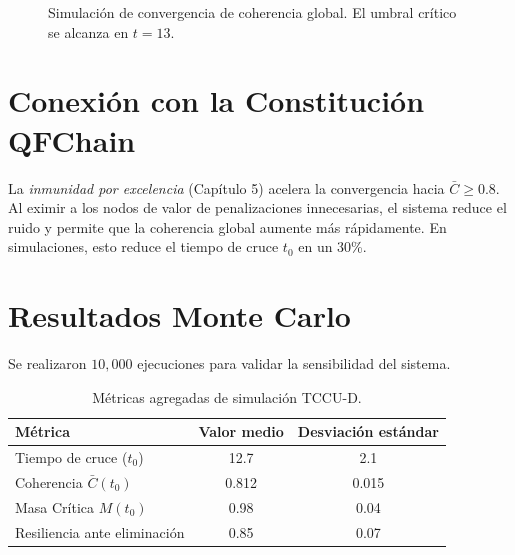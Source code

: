 \begin{figure}[H]
\centering
{}
\caption{Simulación de convergencia de coherencia global. El umbral crítico se alcanza en $t=13$.}
\label{fig:emergencia_demo}
\end{figure}

\section{Conexión con la Constitución QFChain}
La \emph{inmunidad por excelencia} (Capítulo 5) acelera la convergencia hacia $\bar{C}\ge 0.8$. Al eximir a los nodos de valor de penalizaciones innecesarias, el sistema reduce el ruido y permite que la coherencia global aumente más rápidamente. En simulaciones, esto reduce el tiempo de cruce $t_0$ en un 30\%.

\section{Resultados Monte Carlo}
Se realizaron $10,000$ ejecuciones para validar la sensibilidad del sistema.

\begin{table}[H]
\centering
\caption{Métricas agregadas de simulación TCCU-D.}
\label{tab:resultados_mc}
\begin{tabular}{lcc}
\toprule
Métrica & Valor medio & Desviación estándar \\
\midrule
Tiempo de cruce ($t_0$) & 12.7 & 2.1 \\
Coherencia $\bar{C}(t_0)$ & 0.812 & 0.015 \\
Masa Crítica $M(t_0)$ & 0.98 & 0.04 \\
Resiliencia ante eliminación & 0.85 & 0.07 \\
\bottomrule
\end{tabular}
\end{table}

